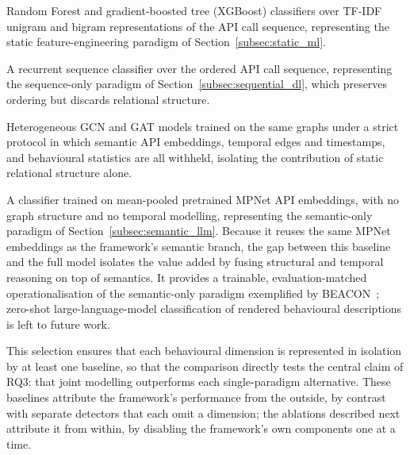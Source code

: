 \documentclass[%
    BCOR=10mm,
    DIV=13,
    toc=bibliography,
    toc=listof,
    oneside,
    12pt,
]{scrbook}
\begin{document}
\begin{description}[leftmargin=0pt, labelwidth=0pt, labelsep=\parskip, style=nextline]

\item[\textbf{Classical machine learning.}] Random Forest and gradient-boosted
tree (XGBoost) classifiers over TF-IDF unigram and bigram representations of
the API call sequence, representing the static
feature-engineering paradigm of Section~\ref{subsec:static_ml}.

\item[\textbf{Sequential deep learning.}] A recurrent sequence classifier over
the ordered API call sequence, representing the sequence-only paradigm of
Section~\ref{subsec:sequential_dl}, which preserves ordering but discards
relational structure.

\item[\textbf{Static graph neural networks.}] Heterogeneous GCN and GAT
models trained on the same graphs under a strict protocol in which semantic
API embeddings, temporal edges and timestamps, and behavioural statistics are
all withheld, isolating the contribution of static relational structure alone.

\item[\textbf{Semantic-embedding classification.}] A classifier trained on
mean-pooled pretrained MPNet API embeddings, with no graph structure and no
temporal modelling, representing the semantic-only paradigm of
Section~\ref{subsec:semantic_llm}. Because it reuses the same MPNet embeddings
as the framework's semantic branch, the gap between this baseline and the full
model isolates the value added by fusing structural and temporal reasoning on
top of semantics. It provides a trainable, evaluation-matched operationalisation
of the semantic-only paradigm exemplified by BEACON~\cite{perera2023beacon};
zero-shot large-language-model classification of rendered behavioural
descriptions is left to future work.

\end{description}

This selection ensures that each behavioural dimension is represented in
isolation by at least one baseline, so that the comparison directly tests the
central claim of RQ3: that joint modelling outperforms each single-paradigm
alternative. These baselines attribute the framework's performance from the
outside, by contrast with separate detectors that each omit a dimension; the
ablations described next attribute it from within, by disabling the framework's
own components one at a time.
\end{document}
